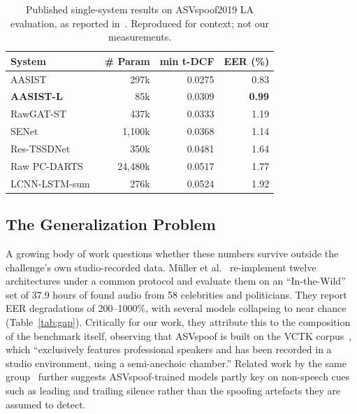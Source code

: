 \documentclass[conference]{IEEEtran}
\begin{document}
\begin{table}[t]
\caption{Published single-system results on ASVspoof2019 LA evaluation, as
reported in~\cite{jung2022aasist}. Reproduced for context; not our
measurements.}
\label{tab:sota}
\centering
\footnotesize
\begin{tabular}{@{}lrrr@{}}
\toprule
\textbf{System} & \textbf{\# Param} & \textbf{min t-DCF} & \textbf{EER (\%)}\\
\midrule
AASIST~\cite{jung2022aasist}            & 297k    & 0.0275 & 0.83\\
\textbf{AASIST-L}~\cite{jung2022aasist} & 85k     & 0.0309 & \textbf{0.99}\\
RawGAT-ST~\cite{tak2021rawgat}          & 437k    & 0.0333 & 1.19\\
SENet                                   & 1{,}100k & 0.0368 & 1.14\\
Res-TSSDNet                             & 350k    & 0.0481 & 1.64\\
Raw PC-DARTS~\cite{ge2021rawpcdarts}    & 24{,}480k & 0.0517 & 1.77\\
LCNN-LSTM-sum~\cite{wang2021comparative} & 276k   & 0.0524 & 1.92\\
\bottomrule
\end{tabular}
\end{table}

\subsection{The Generalization Problem}

A growing body of work questions whether these numbers survive outside the
challenge's own studio-recorded data. M\"uller et al.~\cite{muller2022generalize}
re-implement twelve architectures under a common protocol and evaluate them on
an ``In-the-Wild'' set of 37.9 hours of found audio from 58 celebrities and
politicians. They report EER degradations of 200--1000\%, with several models
collapsing to near chance (Table~\ref{tab:gap}). Critically for our work, they
attribute this to the composition of the benchmark itself, observing that
ASVspoof is built on the VCTK corpus~\cite{yamagishi2019vctk}, which
``exclusively features professional speakers and has been recorded in a studio
environment, using a semi-anechoic chamber.'' Related work by the same
group~\cite{muller2021silence} further suggests ASVspoof-trained models partly
key on non-speech cues such as leading and trailing silence rather than the
spoofing artefacts they are assumed to detect.
\end{document}
